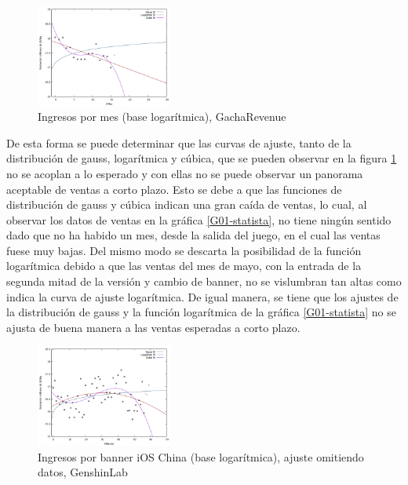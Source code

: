 \documentclass[osajnl,twocolumn,showpacs,superscriptaddress,10pt]{revtex4-2}
\begin{document}
\begin{figure}[H]
    \begin{center}
        \includegraphics[width=0.4\textwidth]{img/GIRev02.pdf}
        \caption{\label{G02-GachaRevenue}Ingresos por mes (base logarítmica), GachaRevenue}
    \end{center}
\end{figure}
De esta forma se puede determinar que las curvas de ajuste, tanto de la distribución de gauss, logarítmica y cúbica, que se pueden observar en la figura \ref{G02-GachaRevenue} no se acoplan a lo esperado y con ellas no se puede observar un panorama aceptable de ventas a corto plazo. Esto se debe a que las funciones de distribución de gauss y cúbica indican una gran caída de ventas, lo cual, al observar los datos de ventas en la gráfica \ref{G01-statista}, no tiene ningún sentido dado que no ha habido un mes, desde la salida del juego, en el cual las ventas fuese muy bajas. Del mismo modo se descarta la posibilidad de la función logarítmica debido a que las ventas del mes de mayo, con la entrada de la segunda mitad de la versión y cambio de banner, no se vislumbran tan altas como indica la curva de ajuste logarítmica. De igual manera, se tiene que los ajustes de la distribución de gauss y la función logarítmica de la gráfica \ref{G01-statista} no se ajusta de buena manera a las ventas esperadas a corto plazo.
\begin{figure}[H]
    \begin{center}
        \includegraphics[width=0.4\textwidth]{img/GIBannChRev02.pdf}
        \caption{\label{G03-iOS}Ingresos por banner iOS China (base logarítmica), ajuste omitiendo datos, GenshinLab}
    \end{center}
\end{figure}
\end{document}
